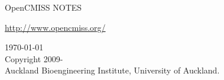 \thispagestyle{empty}

\begin{center}
   \huge OpenCMISS NOTES
   \vspace{10mm}   

   \large \url{http://www.opencmiss.org/}
   \vspace{10mm}   

   \begin{figure}[htbp] \centering
   \end{figure} %
   \vspace{10mm}   

   \vspace{5mm}
   \today\\   %
   \vspace{20mm}
   \small
   \textcopyright \thickspace Copyright 2009-\\
   Auckland Bioengineering Institute, University of Auckland.
\end{center}





